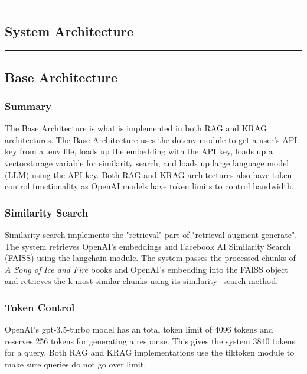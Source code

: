 {\color{gray}\hrule}
\begin{center}
\section{System Architecture}
\bigskip
\end{center}
{\color{gray}\hrule}

\subsection{Base Architecture}

\subsubsection{Summary}
The Base Architecture is what is implemented in both RAG and KRAG architectures. The Base Architecture uses the dotenv module to get a user's API key from a .env file, loads up the embedding with the API key, loads up a vectorstorage variable for similarity search, and loads up large language model (LLM) using the API key. Both RAG and KRAG architectures also have token control functionality as OpenAI models have token limits to control bandwidth.

\subsubsection{Similarity Search}
Similarity search implements the "retrieval" part of "retrieval augment generate". The system retrieves OpenAI's embeddings and Facebook AI Similarity Search (FAISS) using the langchain module. The system passes the processed chunks of \textit{A Song of Ice and Fire} books and OpenAI's embedding into the FAISS object and retrieves the k most similar chunks using its similarity\_search method.

\subsubsection{Token Control}
OpenAI's gpt-3.5-turbo model has an total token limit of 4096 tokens and reserves 256 tokens for generating a response. This gives the system 3840 tokens for a query. Both RAG and KRAG implementations use the tiktoken module to make sure queries do not go over limit.

